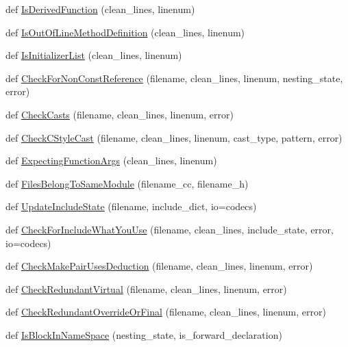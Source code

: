 \begin{DoxyCompactItemize}
\item 
def \hyperlink{namespacecpplint_ac8519cf084d818c931eac29994b03f55}{Is\+Derived\+Function} (clean\+\_\+lines, linenum)
\item 
def \hyperlink{namespacecpplint_a52e4468f674e140c256254eb0d1cf007}{Is\+Out\+Of\+Line\+Method\+Definition} (clean\+\_\+lines, linenum)
\item 
def \hyperlink{namespacecpplint_ae06fb1dd669681214573c0441b7e854f}{Is\+Initializer\+List} (clean\+\_\+lines, linenum)
\item 
def \hyperlink{namespacecpplint_a97f01c7d6e7e6d38b52744ab393d4160}{Check\+For\+Non\+Const\+Reference} (filename, clean\+\_\+lines, linenum, nesting\+\_\+state, error)
\item 
def \hyperlink{namespacecpplint_a59c5f44ae1dbedad109809d46e80588e}{Check\+Casts} (filename, clean\+\_\+lines, linenum, error)
\item 
def \hyperlink{namespacecpplint_ac23d9b29d869054db2ece1e7d5196349}{Check\+C\+Style\+Cast} (filename, clean\+\_\+lines, linenum, cast\+\_\+type, pattern, error)
\item 
def \hyperlink{namespacecpplint_a7657def0315cfe229ba436632f2d5042}{Expecting\+Function\+Args} (clean\+\_\+lines, linenum)
\item 
def \hyperlink{namespacecpplint_a66083e7d453e845a2751e76043fcd9ea}{Files\+Belong\+To\+Same\+Module} (filename\+\_\+cc, filename\+\_\+h)
\item 
def \hyperlink{namespacecpplint_a127416bee5c376937479b3119a727817}{Update\+Include\+State} (filename, include\+\_\+dict, io=codecs)
\item 
def \hyperlink{namespacecpplint_a8e1a5bea9f77246f8a0ae98a23d8d04e}{Check\+For\+Include\+What\+You\+Use} (filename, clean\+\_\+lines, include\+\_\+state, error, io=codecs)
\item 
def \hyperlink{namespacecpplint_add392d0ab0e8bcfeea6d02410229a0cc}{Check\+Make\+Pair\+Uses\+Deduction} (filename, clean\+\_\+lines, linenum, error)
\item 
def \hyperlink{namespacecpplint_a828985bee0575cfbb64212db74b61d9a}{Check\+Redundant\+Virtual} (filename, clean\+\_\+lines, linenum, error)
\item 
def \hyperlink{namespacecpplint_ab4f9b0390c702f149cec4030901d249d}{Check\+Redundant\+Override\+Or\+Final} (filename, clean\+\_\+lines, linenum, error)
\item 
def \hyperlink{namespacecpplint_a618e046738f246f01972bce339ee5d49}{Is\+Block\+In\+Name\+Space} (nesting\+\_\+state, is\+\_\+forward\+\_\+declaration)

\end{DoxyCompactItemize}
